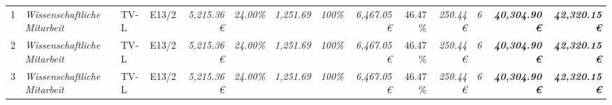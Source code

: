 \begin{table}[]
\begin{tabular}{clllcrrrrrrrrrr}
1                                                                                       & \multicolumn{2}{l}{\cellcolor[HTML]{FFFF99}\textit{Wissenschaftliche Mitarbeit}}      & \cellcolor[HTML]{FFFF99}TV-L      & \cellcolor[HTML]{FFFF99}E13/2                & \cellcolor[HTML]{FFFF99}\textit{5,215.36 €}         & \textit{24.00\%}                                      & \textit{1,251.69}                            & \cellcolor[HTML]{FFFF99}\textit{100\%}                  & \cellcolor[HTML]{92D050}\textit{6,467.05 €}  & 46.47 \%                                       & \cellcolor[HTML]{92D050}\textit{250.44 €}    & \cellcolor[HTML]{FFFF99}\textit{6}           & \cellcolor[HTML]{BFBFBF}\textit{\textbf{40,304.90 €}}           & \textit{\textbf{42,320.15 €}}                                                                 \\
2                                                                                       & \multicolumn{2}{l}{\cellcolor[HTML]{FFFF99}\textit{Wissenschaftliche Mitarbeit}}      & \cellcolor[HTML]{FFFF99}TV-L      & \cellcolor[HTML]{FFFF99}E13/2                & \cellcolor[HTML]{FFFF99}\textit{5,215.36 €}         & \textit{24.00\%}                                      & \textit{1,251.69}                            & \cellcolor[HTML]{FFFF99}\textit{100\%}                  & \cellcolor[HTML]{92D050}\textit{6,467.05 €}  & 46.47 \%                                       & \cellcolor[HTML]{92D050}\textit{250.44 €}    & \cellcolor[HTML]{FFFF99}\textit{6}           & \cellcolor[HTML]{BFBFBF}\textit{\textbf{40,304.90 €}}           & \textit{\textbf{42,320.15 €}}                                                                 \\
3                                                                                       & \multicolumn{2}{l}{\cellcolor[HTML]{FFFF99}\textit{Wissenschaftliche Mitarbeit}}      & \cellcolor[HTML]{FFFF99}TV-L      & \cellcolor[HTML]{FFFF99}E13/2                & \cellcolor[HTML]{FFFF99}\textit{5,215.36 €}         & \textit{24.00\%}                                      & \textit{1,251.69}                            & \cellcolor[HTML]{FFFF99}\textit{100\%}                  & \cellcolor[HTML]{92D050}\textit{6,467.05 €}  & 46.47 \%                                       & \cellcolor[HTML]{92D050}\textit{250.44 €}    & \cellcolor[HTML]{FFFF99}\textit{6}           & \cellcolor[HTML]{BFBFBF}\textit{\textbf{40,304.90 €}}           & \textit{\textbf{42,320.15 €}}                                                                 \\

\end{tabular}
\end{table}
